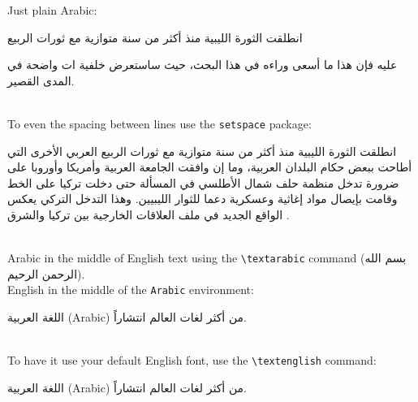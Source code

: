 

Just plain Arabic:
\ \\

\Large{
\begin{Arabic}

انطلقت الثورة الليبية منذ أكثر من سنة متوازية مع ثورات الربيع 

عليه فإن هذا ما أسعى وراءه في هذا البحث، حيث ساستعرض خلفية ات واضحة في المدى القصير.

\end{Arabic}
}
\ \\

To even the spacing between lines use the \verb|setspace| package:
\ \\

\begin{Arabic}


انطلقت الثورة الليبية منذ أكثر من سنة متوازية مع ثورات الربيع العربي الأخرى التي أطاحت ببعض حكام البلدان العربية، وما إن وافقت الجامعة العربية وأمريكا وأوروبا على ضرورة تدخل منظمة حلف شمال الأطلسي في المسألة حتى دخلت تركيا على الخط وقامت بإيصال مواد إغاثية وعسكرية دعما للثوار الليبيين. وهذا التدخل التركي يعكس الواقع الجديد في ملف العلاقات الخارجية بين تركيا والشرق .

\end{Arabic}
\ \\

Arabic in the middle of English text using the \verb|\textarabic| command (\textarabic{بسم الله الرحمن الرحيم}).
\ \\

English in the middle of the \verb|Arabic| environment:
\ \\

\begin{Arabic}

اللغة العربية (Arabic) من أكثر لغات العالم انتشاراً.

\end{Arabic}
\ \\

To have it use your default English font, use the \verb|\textenglish| command:
\ \\

\begin{Arabic}

اللغة العربية (\textenglish{Arabic}) من أكثر لغات العالم انتشاراً.

\end{Arabic}











